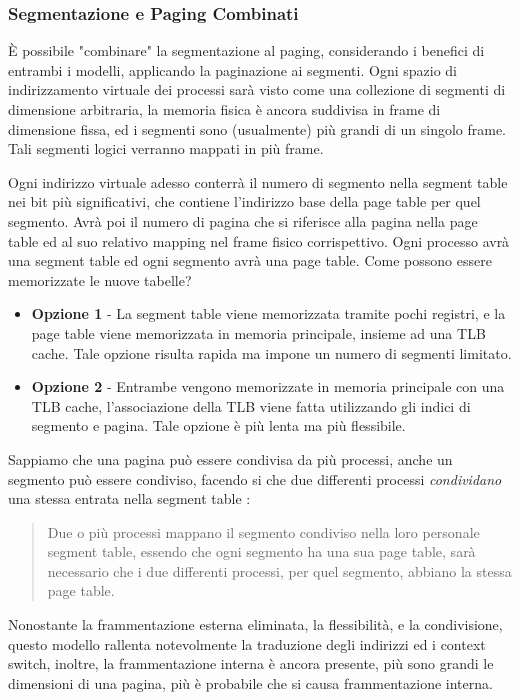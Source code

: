 \documentclass[12pt, letterpaper]{article}
\begin{document}
\subsubsection{Segmentazione e Paging Combinati}
 È possibile "combinare" la segmentazione al paging, considerando i benefici di entrambi i modelli, applicando 
 la paginazione ai segmenti. Ogni spazio di indirizzamento virtuale dei processi sarà visto come una collezione 
 di segmenti di dimensione arbitraria, la memoria fisica è ancora suddivisa in frame di dimensione fissa, 
 ed i segmenti sono (usualmente) più grandi di un singolo frame. Tali segmenti logici verranno mappati in più 
 frame.
 \begin{figure}[h]
\end{figure}\newpage
Ogni indirizzo virtuale adesso conterrà il numero di segmento nella segment table nei bit più significativi, che 
contiene l'indirizzo base della page table per quel segmento. Avrà poi il numero di pagina che si riferisce alla 
pagina nella page table ed al suo relativo mapping nel frame fisico corrispettivo. Ogni processo avrà una segment table 
ed ogni segmento avrà una page table. Come possono essere memorizzate le nuove tabelle? \begin{itemize}
    \item \textbf{Opzione 1} - La segment table viene memorizzata tramite pochi registri, e la page table viene memorizzata 
    in memoria principale, insieme ad una TLB cache. Tale opzione risulta rapida ma impone un numero di segmenti limitato.
    \item \textbf{Opzione 2} - Entrambe vengono memorizzate in memoria principale con una TLB cache, l'associazione della TLB 
    viene fatta utilizzando gli indici di segmento e pagina. Tale opzione è più lenta ma più flessibile.
\end{itemize}
Sappiamo che una pagina può essere condivisa da più processi, anche un segmento può essere condiviso, facendo si che due 
differenti processi \textit{condividano} una stessa entrata nella segment table : 
\begin{quote}
    Due o più processi mappano il segmento condiviso nella loro personale segment table, essendo che ogni segmento ha 
    una sua page table, sarà necessario che i due differenti processi, per quel segmento, abbiano la stessa page table. 
\end{quote}
Nonostante la frammentazione esterna eliminata, la flessibilità, e la condivisione, questo modello rallenta 
notevolmente la traduzione degli indirizzi ed i context switch, inoltre, la frammentazione interna è ancora presente, 
più sono grandi le dimensioni di una pagina, più è probabile che si causa frammentazione interna.
\end{document}
